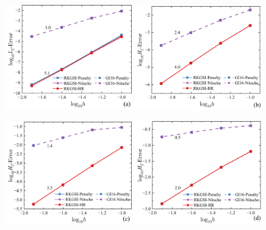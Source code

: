 \newpage
\begin{figure}[H]
    \centering
    \begin{subcaptiongroup}
    \includegraphics[width=0.49\textwidth]{figure/PHR/R/QL2.png}
    \label{RQL2}
    \includegraphics[width=0.49\textwidth]{figure/PHR/R/QH1.png}
    \label{RQH1}
    \end{subcaptiongroup}
    \begin{subcaptiongroup}
    \includegraphics[width=0.49\textwidth]{figure/PHR/R/QH2.png}
    \label{RQH2}
    \includegraphics[width=0.49\textwidth]{figure/PHR/R/QH3.png}
    \label{RQH3}
    \end{subcaptiongroup}
\caption{}
\label{RQLH}
\end{figure}
